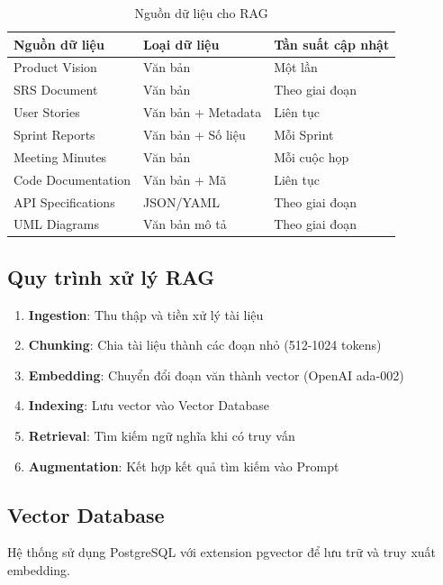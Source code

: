 \documentclass[12pt,a4paper]{report}
\begin{document}
\begin{table}[H]
\centering
\caption{Nguồn dữ liệu cho RAG}
\begin{tabular}{|p{4.5cm}|p{5cm}|p{4.5cm}|}
\hline
\textbf{Nguồn dữ liệu} & \textbf{Loại dữ liệu} & \textbf{Tần suất cập nhật} \\
\hline
Product Vision & Văn bản & Một lần \\
\hline
SRS Document & Văn bản & Theo giai đoạn \\
\hline
User Stories & Văn bản + Metadata & Liên tục \\
\hline
Sprint Reports & Văn bản + Số liệu & Mỗi Sprint \\
\hline
Meeting Minutes & Văn bản & Mỗi cuộc họp \\
\hline
Code Documentation & Văn bản + Mã & Liên tục \\
\hline
API Specifications & JSON/YAML & Theo giai đoạn \\
\hline
UML Diagrams & Văn bản mô tả & Theo giai đoạn \\
\hline
\end{tabular}
\label{tab:rag_sources}
\end{table}

\subsection{Quy trình xử lý RAG}

\begin{enumerate}
\item \textbf{Ingestion}: Thu thập và tiền xử lý tài liệu
\item \textbf{Chunking}: Chia tài liệu thành các đoạn nhỏ (512-1024 tokens)
\item \textbf{Embedding}: Chuyển đổi đoạn văn thành vector (OpenAI ada-002)
\item \textbf{Indexing}: Lưu vector vào Vector Database
\item \textbf{Retrieval}: Tìm kiếm ngữ nghĩa khi có truy vấn
\item \textbf{Augmentation}: Kết hợp kết quả tìm kiếm vào Prompt
\end{enumerate}

\subsection{Vector Database}

Hệ thống sử dụng PostgreSQL với extension pgvector để lưu trữ và truy xuất embedding.
\end{document}
